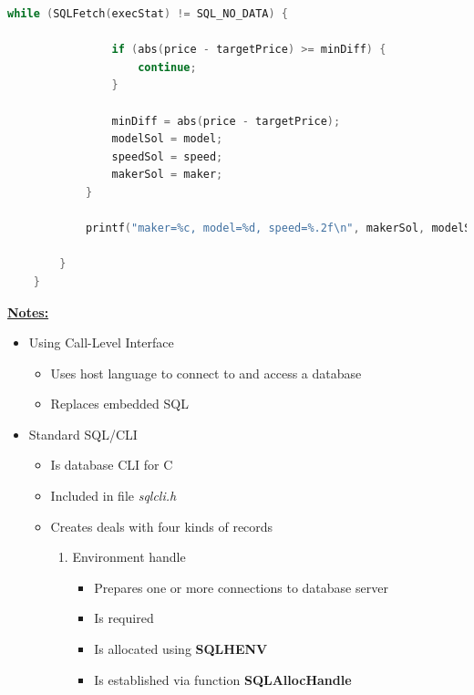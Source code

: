 \documentclass[12pt]{article}
\begin{document}
\begin{enumerate}[1.]
\begin{enumerate}[a)]
\begin{lstlisting}[language=c]
            while (SQLFetch(execStat) != SQL_NO_DATA) {

                if (abs(price - targetPrice) >= minDiff) {
                    continue;
                }

                minDiff = abs(price - targetPrice);
                modelSol = model;
                speedSol = speed;
                makerSol = maker;
            }

            printf("maker=%c, model=%d, speed=%.2f\n", makerSol, modelSol, speedSol);

        }
    }
    \end{lstlisting}

        \bigskip

        \underline{\textbf{Notes:}}

        \begin{itemize}
            \item Using Call-Level Interface
            \begin{itemize}
                \item Uses host language to connect to and access a database
                \item Replaces embedded SQL
            \end{itemize}
            \item Standard SQL/CLI
            \begin{itemize}
                \item Is database CLI for C
                \item Included in file \textit{sqlcli.h}
                \item Creates deals with four kinds of records

                \bigskip

                \begin{enumerate}[1.]
                    \item Environment handle
                    \begin{itemize}
                        \item Prepares one or more connections to database server
                        \item Is required
                        \item Is allocated using \textbf{SQLHENV}
                        \item Is established via function \textbf{SQLAllocHandle}


\end{itemize}
\end{enumerate}
\end{itemize}
\end{itemize}
\end{enumerate}
\end{enumerate}
\end{document}
